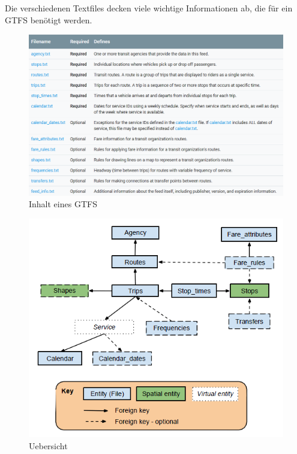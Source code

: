 \documentclass[a4paper,12pt]{scrartcl}
\begin{document}
Die verschiedenen Textfiles decken viele wichtige Informationen ab, die für ein GTFS benötigt werden.
 \begin{figure}[]
 	\includegraphics[width=14cm]{img/inhalt.png}
 	\caption{Inhalt eines GTFS \cite{gtfsInhalt}}
 	\label{fig:gtfs-inhalt}
 \end{figure}
 \cite{Inhalt}
\begin{figure}[]
	\centering
	\includegraphics[scale=0.75]{img/GTFS_data_model_diagram.png}
 	\caption{Uebersicht \cite{gtfsUebersicht}}
	\label{fig:gtfs-uebersicht}
\end{figure}
 
\end{document}
